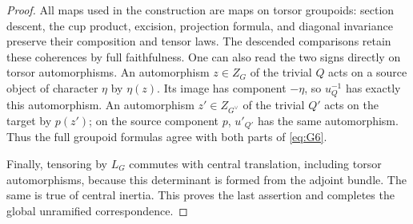 \documentclass[11pt]{article}
\numberwithin{equation}{section}
\theoremstyle{definition}
\theoremstyle{remark}
\begin{document}
\begin{proof}
All maps used in the construction are maps on torsor groupoids:
section descent, the cup product, excision, projection formula, and
diagonal invariance preserve their composition and tensor laws.
The descended comparisons retain these coherences by full
faithfulness.  One can also read the two signs directly on torsor
automorphisms.  An automorphism \(z\in Z_G\) of the trivial
\(Q\) acts on a source object of character \(\eta\) by
\(\eta(z)\).  Its image has component \(-\eta\), so
\(u_Q^{-1}\) has exactly this automorphism.  An automorphism
\(z'\in Z_{G^\vee}\) of the trivial \(Q'\) acts on the
target by \(p(z')\); on the source component \(p\),
\(u'_{Q'}\) has the same automorphism.  Thus the full groupoid
formulas agree with both parts of \eqref{eq:G6}.

Finally, tensoring by \(L_G\) commutes with central
translation, including torsor automorphisms, because this determinant
is formed from the adjoint bundle.  The same is true of central
inertia.  This proves the last assertion and completes the global
unramified correspondence.
\end{proof}
\end{document}
